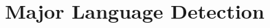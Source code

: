 \documentclass{acm_proc_article-sp}
\begin{document}
\title{Major Language Detection}
%
%
%
%
%

%
\author{
%
%
}
\end{document}
